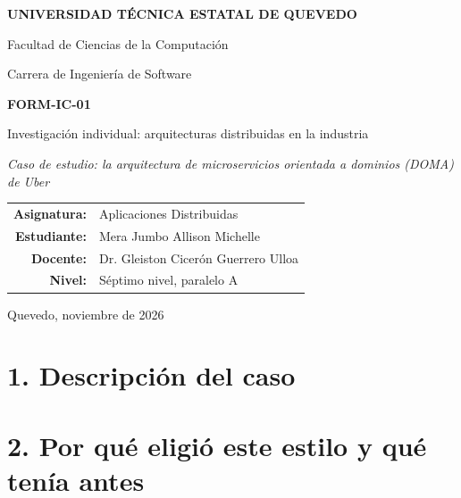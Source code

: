 \documentclass[11pt,a4paper]{article}
\begin{document}
\begin{titlepage}
  \centering
  {\large\bfseries UNIVERSIDAD TÉCNICA ESTATAL DE QUEVEDO\par}
  \vspace{0.3cm}
  {\large Facultad de Ciencias de la Computación\par}
  \vspace{0.2cm}
  {\large Carrera de Ingeniería de Software\par}
  \vspace{2cm}
  {\Large\bfseries FORM-IC-01\par}
  \vspace{0.4cm}
  {\Large Investigación individual: arquitecturas distribuidas en la industria\par}
  \vspace{0.6cm}
  {\large\itshape Caso de estudio: la arquitectura de microservicios orientada a dominios (DOMA) de Uber\par}
  \vfill
  \begin{tabular}{rl}
    \textbf{Asignatura:} & Aplicaciones Distribuidas \\
    \textbf{Estudiante:} & Mera Jumbo Allison Michelle \\
    \textbf{Docente:}    & Dr. Gleiston Cicerón Guerrero Ulloa \\
    \textbf{Nivel:}      & Séptimo nivel, paralelo A \\
  \end{tabular}
  \vspace{1.5cm}

  {\large Quevedo, noviembre de 2026\par}
\end{titlepage}

\section*{1. Descripción del caso}

\section*{2. Por qué eligió este estilo y qué tenía antes}
\end{document}
